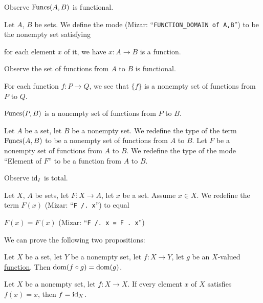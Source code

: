 \documentclass{article}
\begin{document}
Observe $\operatorname{Funcs}(A,B)$ is functional.

\begin{definition}
Let $A$, $B$ be sets. We define the mode  (Mizar: ``\verb#FUNCTION_DOMAIN of A,B#'') to be the nonempty set satisfying
\begin{defn}
\item for each element $x$ of it, we have
  $x\colon A\to B$ is a function.
\end{defn}
\end{definition}

Observe the set of functions from $A$ to $B$ is functional.

\begin{thm}
\item\label{funct2:121} For each function $f\colon P\to Q$,
  we see that $\{f\}$ is a nonempty set of functions from $P$ to $Q$.
\item\label{funct2:122} $\operatorname{Funcs}(P,B)$ is a nonempty set of functions
  from $P$ to $B$.
\end{thm}

\begin{definition}
Let $A$ be a set, let $B$ be a nonempty set.
We redefine the type of the term $\operatorname{Funcs}(A,B)$ to be a nonempty set of
functions from $A$ to $B$.
Let $F$ be a nonempty set of functions from $A$ to $B$.
We redefine the type of the mode ``Element of $F$'' to be a function
from $A$ to $B$.
\end{definition}

Observe $\operatorname{id}_{I}$ is total.

\begin{definition}
Let $X$, $A$ be sets, let $F\colon X\to A$, let $x$ be a set. Assume
$x\in X$. We redefine the term $F(x)$ (Mizar: ``\verb#F /. x#'') to
equal
\begin{defn}
\item $F(x)=F(x)$ (Mizar: ``\verb#F /. x = F . x#'')
\end{defn}
\end{definition}

We can prove the following two propositions:
\begin{thm}
\item\label{funct2:123} Let $X$ be a set, let $Y$ be a nonempty set,
  let $f\colon X\to Y$, let $g$ be an $X$-valued \hyperlink{definition:funct1:nm1}{function}.
  Then $\operatorname{dom}(f\circ g)=\operatorname{dom}(g)$.
\item\label{funct2:124} Let $X$ be a nonempty set, let $f\colon X\to X$.
  If every element $x$ of $X$ satisfies $f(x)=x$, then $f=\operatorname{id}_{X}$.
\end{thm}
\end{document}
